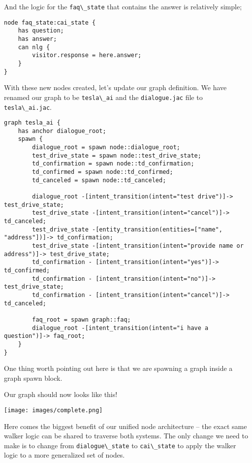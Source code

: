 And the logic for the \passthrough{\lstinline!faq\_state!} that contains
the answer is relatively simple;

\begin{lstlisting}
node faq_state:cai_state {
    has question;
    has answer;
    can nlg {
        visitor.response = here.answer;
    }
}
\end{lstlisting}

With these new nodes created, let's update our graph definition. We have
renamed our graph to be \passthrough{\lstinline!tesla\_ai!} and the
\passthrough{\lstinline!dialogue.jac!} file to
\passthrough{\lstinline!tesla\_ai.jac!}.

\begin{lstlisting}
graph tesla_ai {
    has anchor dialogue_root;
    spawn {
        dialogue_root = spawn node::dialogue_root;
        test_drive_state = spawn node::test_drive_state;
        td_confirmation = spawn node::td_confirmation;
        td_confirmed = spawn node::td_confirmed;
        td_canceled = spawn node::td_canceled;

        dialogue_root -[intent_transition(intent="test drive")]-> test_drive_state;
        test_drive_state -[intent_transition(intent="cancel")]-> td_canceled;
        test_drive_state -[entity_transition(entities=["name", "address"])]-> td_confirmation;
        test_drive_state -[intent_transition(intent="provide name or address")]-> test_drive_state;
        td_confirmation - [intent_transition(intent="yes")]-> td_confirmed;
        td_confirmation - [intent_transition(intent="no")]-> test_drive_state;
        td_confirmation - [intent_transition(intent="cancel")]-> td_canceled;

        faq_root = spawn graph::faq;
        dialogue_root -[intent_transition(intent="i have a question")]-> faq_root;
    }
}
\end{lstlisting}

One thing worth pointing out here is that we are spawning a graph inside
a graph spawn block.

Our graph should now looks like this!

\texttt{[image: images/complete.png]}

Here comes the biggest benefit of our unified node architecture -- the
exact same walker logic can be shared to traverse both systems. The only
change we need to make is to change from
\passthrough{\lstinline!dialogue\_state!} to
\passthrough{\lstinline!cai\_state!} to apply the walker logic to a more
generalized set of nodes.

